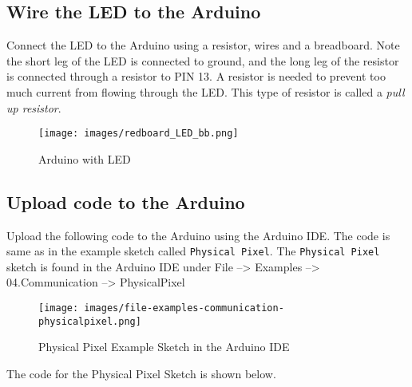 \documentclass{book}
\makeatletter
\def\maxwidth{\ifdim\Gin@nat@width>\linewidth\linewidth
\else\Gin@nat@width\fi}
\let\Oldincludegraphics\includegraphics
\renewcommand{\includegraphics}[1]{\Oldincludegraphics[width=.8\maxwidth]{#1}}
\newcommand{\passthrough}[1]{#1}
\makeatother
\begin{document}
    
        \hypertarget{wire-the-led-to-the-arduino}{%
\subsection{Wire the LED to the
Arduino}\label{wire-the-led-to-the-arduino}}
    




    
        Connect the LED to the Arduino using a resistor, wires and a breadboard.
Note the short leg of the LED is connected to ground, and the long leg
of the resistor is connected through a resistor to PIN 13. A resistor is
needed to prevent too much current from flowing through the LED. This
type of resistor is called a \emph{pull up resistor}.
    




    
        \begin{figure}
\centering
\texttt{[image: images/redboard\_LED\_bb.png]}
\caption{Arduino with LED}
\end{figure}
    




    
        \hypertarget{upload-code-to-the-arduino}{%
\subsection{Upload code to the
Arduino}\label{upload-code-to-the-arduino}}
    




    
        Upload the following code to the Arduino using the Arduino IDE. The code
is same as in the example sketch called
\passthrough{\lstinline!Physical Pixel!}. The
\passthrough{\lstinline!Physical Pixel!} sketch is found in the Arduino
IDE under File --\textgreater{} Examples --\textgreater{}
04.Communication --\textgreater{} PhysicalPixel

\begin{figure}
\centering
\texttt{[image: images/file-examples-communication-physicalpixel.png]}
\caption{Physical Pixel Example Sketch in the Arduino IDE}
\end{figure}

The code for the Physical Pixel Sketch is shown below.
    
\end{document}
